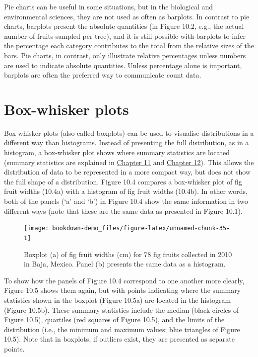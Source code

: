 \documentclass[
]{scrbook}
\begin{document}
Pie charts can be useful in some situations, but in the biological and environmental sciences, they are not used as often as barplots.
In contrast to pie charts, barplots present the absolute quantities (in Figure 10.2, e.g., the actual number of fruits sampled per tree), and it is still possible with barplots to infer the percentage each category contributes to the total from the relative sizes of the bars.
Pie charts, in contrast, only illustrate relative percentages unless numbers are used to indicate absolute quantities.
Unless percentage alone is important, barplots are often the preferred way to communicate count data.

\hypertarget{box-whisker-plots}{%
\section{Box-whisker plots}\label{box-whisker-plots}}

Box-whisker plots (also called boxplots) can be used to visualise distributions in a different way than histograms.
Instead of presenting the full distribution, as in a histogram, a box-whisker plot shows where summary statistics are located (summary statistics are explained in \protect\hyperlink{Chapter_11}{Chapter 11} and \protect\hyperlink{Chapter_12}{Chapter 12}).
This allows the distribution of data to be represented in a more compact way, but does not show the full shape of a distribution.
Figure 10.4 compares a box-whisker plot of fig fruit widths (10.4a) with a histogram of fig fruit widths (10.4b).
In other words, both of the panels (`a' and `b') in Figure 10.4 show the same information in two different ways (note that these are the same data as presented in Figure 10.1).

\begin{figure}
\texttt{[image: bookdown-demo\_files/figure-latex/unnamed-chunk-35-1]} \caption{Boxplot (a) of fig fruit widths (cm) for 78 fig fruits collected in 2010 in Baja, Mexico. Panel (b) presents the same data as a histogram.}\label{fig:unnamed-chunk-35}
\end{figure}

To show how the panels of Figure 10.4 correspond to one another more clearly, Figure 10.5 shows them again, but with points indicating where the summary statistics shown in the boxplot (Figure 10.5a) are located in the histogram (Figure 10.5b).
These summary statistics include the median (black circles of Figure 10.5), quartiles (red squares of Figure 10.5), and the limits of the distribution (i.e., the minimum and maximum values; blue triangles of Figure 10.5).
Note that in boxplots, if outliers exist, they are presented as separate points.
\end{document}
